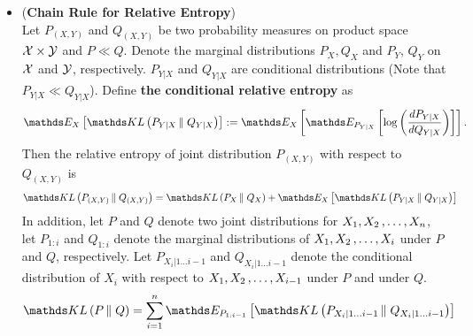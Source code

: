 \documentclass[11pt]{article}
\begin{document}
\begin{itemize}
\item \begin{proposition} (\textbf{Chain Rule for Relative Entropy}) \citep{thomas2006elements}\\
Let $P_{(X, Y)}$ and $Q_{(X, Y)}$ be two probability measures on product space ${\mathcal X} \times {\mathcal Y}$ and $P \ll Q$. Denote the marginal distributions $P_X, Q_X$ and $P_Y$, $Q_Y$ on ${\mathcal X}$ and ${\mathcal Y}$, respectively. $P_{Y|X}$ and $Q_{Y|X}$ are conditional distributions (Note that $P_{Y|X} \ll Q_{Y|X}$).  Define \textbf{the conditional relative entropy} as
\begin{align*}
\E{X}{\kl{P_{Y | X}}{Q_{Y | X}}} := \E{X}{\E{P_{Y|X}}{\log \paren{\frac{dP_{Y| X}}{dQ_{Y | X}}}}}. 
\end{align*} Then the relative entropy of joint distribution $P_{(X, Y)}$ with respect to $Q_{(X, Y)}$ is 
\begin{align}
\kl{P_{(X, Y)}}{Q_{(X, Y)}} &= \kl{P_{X}}{Q_{X}} + \E{X}{\kl{P_{Y | X}}{Q_{Y | X}}} \label{eqn: chain_rule_kl}
\end{align} In addition, let $P$ and $Q$ denote two joint distributions for $X_1, X_2 \,{,}\ldots{,}\, X_n$, let $P_{1:i}$ and $Q_{1:i}$ denote the marginal distributions of $X_1, X_2 \,{,}\ldots{,}\, X_i$ under $P$ and $Q$, respectively. Let $P_{X_i | 1 \ldots i-1}$ and $Q_{X_i | 1 \ldots i-1}$ denote the conditional distribution of $X_i$ with respect to $X_1, X_2 \,{,}\ldots{,}\, X_{i-1}$ under $P$ and under $Q$.
\begin{align}
\kl{P}{Q} &= \sum_{i=1}^{n}\E{P_{1:i-1}}{\kl{P_{X_i | 1 \ldots i-1}}{Q_{X_i | 1 \ldots i-1}}} \label{eqn: chain_rule_kl_k}
\end{align} 
\end{proposition}
\end{itemize}
\end{document}
